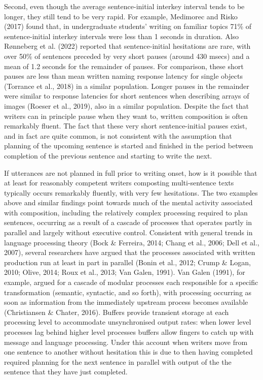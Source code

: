 \documentclass[
  man,floatsintext]{apa7}
\begin{document}
Second, even though the average sentence-initial interkey interval tends to be longer, they still tend to be very rapid. For example, Medimorec and Risko (2017) found that, in undergraduate students' writing on familiar topics 71\% of sentence-initial interkey intervals were less than 1 seconds in duration. Also Rønneberg et al. (2022) reported that sentence-initial hesitations are rare, with over 50\% of sentences preceded by very short pauses (around 430 msecs) and a mean of 1.2 seconds for the remainder of pauses. For comparison, these short pauses are less than mean written naming response latency for single objects (Torrance et al., 2018) in a similar population. Longer pauses in the remainder were similar to response latencies for short sentences when describing arrays of images (Roeser et al., 2019), also in a similar population. Despite the fact that writers can in principle pause when they want to, written composition is often remarkably fluent. The fact that these very short sentence-initial pauses exist, and in fact are quite common, is not consistent with the assumption that planning of the upcoming sentence is started and finished in the period between completion of the previous sentence and starting to write the next.

If utterances are not planned in full prior to writing onset, how is it possible that at least for reasonably competent writers composting multi-sentence texts typically occurs remarkably fluently, with very few hesitations. The two examples above and similar findings point towards much of the mental activity associated with composition, including the relatively complex processing required to plan sentences, occurring as a result of a cascade of processes that operates partly in parallel and largely without executive control. Consistent with general trends in language processing theory (Bock \& Ferreira, 2014; Chang et al., 2006; Dell et al., 2007), several researchers have argued that the processes associated with written production run at least in part in parallel (Bonin et al., 2012; Crump \& Logan, 2010; Olive, 2014; Roux et al., 2013; Van Galen, 1991). Van Galen (1991), for example, argued for a cascade of modular processes each responsible for a specific transformation (semantic, syntactic, and so forth), with processing occurring as soon as information from the immediately upstream process becomes available (Christiansen \& Chater, 2016). Buffers provide transient storage at each processing level to accommodate unsynchronised output rates: when lower level processes lag behind higher level processes buffers allow fingers to catch up with message and language processing. Under this account when writers move from one sentence to another without hesitation this is due to then having completed required planning for the next sentence in parallel with output of the the sentence that they have just completed.
\end{document}
